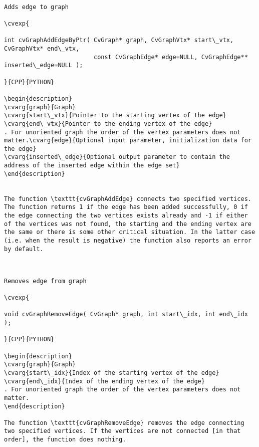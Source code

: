 \begin{verbatim}

Adds edge to graph

\cvexp{

int cvGraphAddEdgeByPtr( CvGraph* graph, CvGraphVtx* start\_vtx, CvGraphVtx* end\_vtx,
                         const CvGraphEdge* edge=NULL, CvGraphEdge** inserted\_edge=NULL );

}{CPP}{PYTHON}

\begin{description}
\cvarg{graph}{Graph}
\cvarg{start\_vtx}{Pointer to the starting vertex of the edge}
\cvarg{end\_vtx}{Pointer to the ending vertex of the edge}
. For unoriented graph the order of the vertex parameters does not matter.\cvarg{edge}{Optional input parameter, initialization data for the edge}
\cvarg{inserted\_edge}{Optional output parameter to contain the address of the inserted edge within the edge set}
\end{description}


The function \texttt{cvGraphAddEdge} connects two specified vertices. The function returns 1 if the edge has been added successfully, 0 if the edge connecting the two vertices exists already and -1 if either of the vertices was not found, the starting and the ending vertex are the same or there is some other critical situation. In the latter case (i.e. when the result is negative) the function also reports an error by default.


\end{verbatim}
\begin{verbatim}

Removes edge from graph

\cvexp{

void cvGraphRemoveEdge( CvGraph* graph, int start\_idx, int end\_idx );

}{CPP}{PYTHON}

\begin{description}
\cvarg{graph}{Graph}
\cvarg{start\_idx}{Index of the starting vertex of the edge}
\cvarg{end\_idx}{Index of the ending vertex of the edge}
. For unoriented graph the order of the vertex parameters does not matter.
\end{description}

The function \texttt{cvGraphRemoveEdge} removes the edge connecting two specified vertices. If the vertices are not connected [in that order], the function does nothing.


\end{verbatim}
